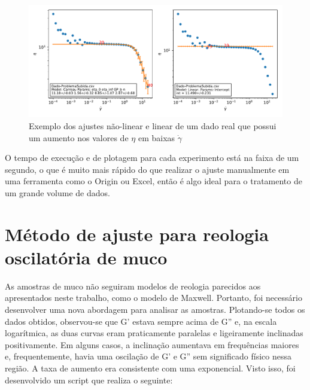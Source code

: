 		\begin{figure}
			\centering
			\includegraphics[width=\textwidth]{imagens/reologia/Dado-ProblemaSubida}
			\caption{Exemplo dos ajustes não-linear e linear de um dado real que possui um aumento nos valores de \(\eta\) em baixas \(\dot{\gamma}\)}
			\label{fig:reologia_dado-problemasubida}
		\end{figure}
		
		O tempo de execução e de plotagem para cada experimento está na faixa de um segundo, o que é muito mais rápido do que realizar o ajuste manualmente em uma ferramenta como o Origin ou Excel, então é algo ideal para o tratamento de um grande volume de dados.
		

		\section{Método de ajuste para reologia oscilatória de muco}
		
		As amostras de muco não seguiram modelos de reologia parecidos aos apresentados neste trabalho, como o modelo de Maxwell. Portanto, foi necessário desenvolver uma nova abordagem para analisar as amostras. Plotando-se todos os dados obtidos, observou-se que G' estava sempre acima de G'' e, na escala logarítmica, as duas curvas eram praticamente paralelas e ligeiramente inclinadas positivamente. Em alguns casos, a inclinação aumentava em frequências maiores e, frequentemente, havia uma oscilação de G' e G'' sem significado físico nessa região. A taxa de aumento era consistente com uma exponencial. Visto isso, foi desenvolvido um script que realiza o seguinte:
		
